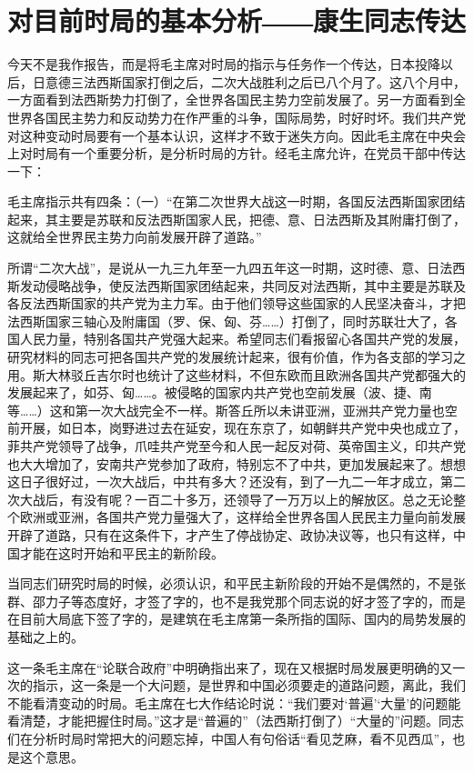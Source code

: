 \section[对目前时局的基本分析――康生同志传达（一九四六年四月二日）]{对目前时局的基本分析――康生同志传达}


今天不是我作报告，而是将毛主席对时局的指示与任务作一个传达，日本投降以后，日意德三法西斯国家打倒之后，二次大战胜利之后已八个月了。这八个月中，一方面看到法西斯势力打倒了，全世界各国民主势力空前发展了。另一方面看到全世界各国民主势力和反动势力在作严重的斗争，国际局势，时好时坏。我们共产党对这种变动时局要有一个基本认识，这样才不致于迷失方向。因此毛主席在中央会上对时局有一个重要分析，是分析时局的方针。经毛主席允许，在党员干部中传达一下：

毛主席指示共有四条：（一）“在第二次世界大战这一时期，各国反法西斯国家团结起来，其主要是苏联和反法西斯国家人民，把德、意、日法西斯及其附庸打倒了，这就给全世界民主势力向前发展开辟了道路。”

所谓“二次大战”，是说从一九三九年至一九四五年这一时期，这时德、意、日法西斯发动侵略战争，使反法西斯国家团结起来，共同反对法西斯，其中主要是苏联及各反法西斯国家的共产党为主力军。由于他们领导这些国家的人民坚决奋斗，才把法西斯国家三轴心及附庸国（罗、保、匈、芬……）打倒了，同时苏联壮大了，各国人民力量，特别各国共产党强大起来。希望同志们看报留心各国共产党的发展，研究材料的同志可把各国共产党的发展统计起来，很有价值，作为各支部的学习之用。斯大林驳丘吉尔时也统计了这些材料，不但东欧而且欧洲各国共产党都强大的发展起来了，如芬、匈……。被侵略的国家内共产党也空前发展（波、捷、南等……）这和第一次大战完全不一样。斯答丘所以未讲亚洲，亚洲共产党力量也空前开展，如日本，岗野进过去在延安，现在东京了，如朝鲜共产党中央也成立了，菲共产党领导了战争，爪哇共产党至今和人民一起反对荷、英帝国主义，印共产党也大大增加了，安南共产党参加了政府，特别忘不了中共，更加发展起来了。想想这日子很好过，一次大战后，中共有多大？还没有，到了一九二一年才成立，第二次大战后，有没有呢？一百二十多万，还领导了一万万以上的解放区。总之无论整个欧洲或亚洲，各国共产党力量强大了，这样给全世界各国人民民主力量向前发展开辟了道路，只有在这条件下，才产生了停战协定、政协决议等，也只有这样，中国才能在这时开始和平民主的新阶段。

当同志们研究时局的时候，必须认识，和平民主新阶段的开始不是偶然的，不是张群、邵力子等态度好，才签了字的，也不是我党那个同志说的好才签了字的，而是在目前大局底下签了字的，是建筑在毛主席第一条所指的国际、国内的局势发展的基础之上的。

这一条毛主席在“论联合政府”中明确指出来了，现在又根据时局发展更明确的又一次的指示，这一条是一个大问题，是世界和中国必须要走的道路问题，离此，我们不能看清变动的时局。毛主席在七大作结论时说：“我们要对‘普遍’‘大量’的问题能看清楚，才能把握住时局。”这才是“普遍的”（法西斯打倒了）“大量的”问题。同志们在分析时局时常把大的问题忘掉，中国人有句俗话“看见芝麻，看不见西瓜”，也是这个意思。

